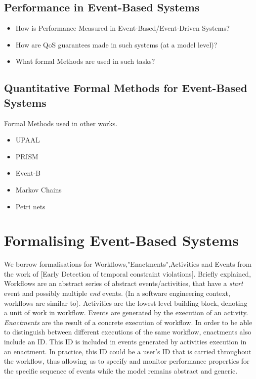 \documentclass[twocolumn]{article}
\begin{document}
\subsection{Performance in Event-Based Systems}
\begin{itemize}
	\item How is Performance Measured in Event-Based/Event-Driven Systems?
	\item How are QoS guarantees made in such systems (at a model level)?
	\item What formal Methods are used in such tasks?
\end{itemize}


\subsection{Quantitative Formal Methods for Event-Based Systems}
Formal Methods used in other works.
\begin{itemize}
	\item UPAAL \cite{ganguly_distributed_2024,norstrom_timed_1999}
	\item PRISM \cite{norman_quantitative_2014,paterson_observation-enhanced_2018}
	\item Event-B \cite{mammar_formal_2024}
	\item Markov Chains \cite{paterson_observation-enhanced_2018}
	\item Petri nets \cite{xavier_framework_2024}
\end{itemize}

\section{Formalising Event-Based Systems}
We borrow formalisations for Workflows,"Enactments",Activities and Events from the work of [Early Detection of temporal constraint violations]. Briefly explained, Workflows are an abstract series of abstract events/activities, that have a {\it start} event and possibly multiple {\it end} events. (In a software engineering context, workflows are similar to). Activities are the lowest level building block, denoting a unit of work in workflow. Events are generated by the execution of an activity. {\it Enactments} are the result of a concrete execution of workflow. In order to be able to distinguish between different executions of the same workflow, enactments also include an ID. This ID is included in events generated by activities execution in an enactment. In practice, this ID could be a user's ID that is carried throughout the workflow, thus allowing us to specify and monitor performance properties for the specific sequence of events while the model remains abstract and generic.
\end{document}

